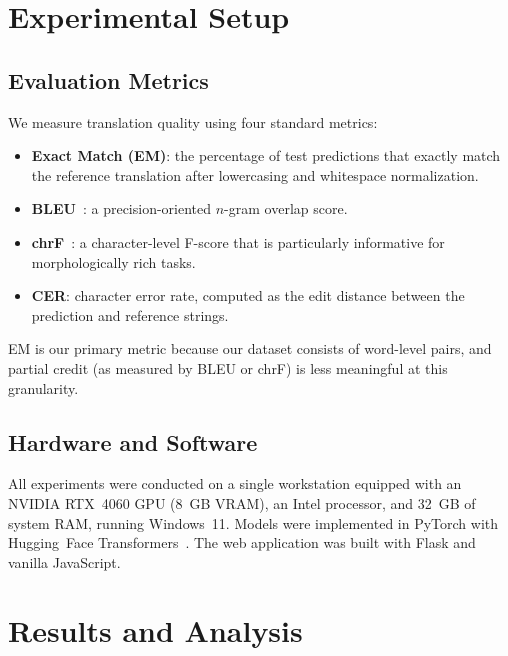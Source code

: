 \documentclass[conference]{IEEEtran}
\begin{document}
\section{Experimental Setup}\label{sec:experiments}

\subsection{Evaluation Metrics}

We measure translation quality using four standard metrics:

\begin{itemize}
    \item \textbf{Exact Match (EM)}: the percentage of test predictions that exactly match the reference translation after lowercasing and whitespace normalization.
    \item \textbf{BLEU}~\cite{papineni2002bleu}: a precision-oriented $n$-gram overlap score.
    \item \textbf{chrF}~\cite{popovic2015chrf}: a character-level F-score that is particularly informative for morphologically rich tasks.
    \item \textbf{CER}: character error rate, computed as the edit distance between the prediction and reference strings.
\end{itemize}

EM is our primary metric because our dataset consists of word-level pairs, and partial credit (as measured by BLEU or chrF) is less meaningful at this granularity.

\subsection{Hardware and Software}

All experiments were conducted on a single workstation equipped with an NVIDIA RTX~4060 GPU (8~GB VRAM), an Intel processor, and 32~GB of system RAM, running Windows~11. Models were implemented in PyTorch with Hugging~Face Transformers~\cite{wolf2020huggingface}. The web application was built with Flask and vanilla JavaScript.

\section{Results and Analysis}\label{sec:results}
\end{document}
